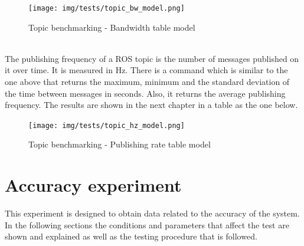 \begin{itemize}
		\begin{figure}[H]
				\begin{center}
			    \texttt{[image: img/tests/topic\_bw\_model.png]}
				\caption[Topic benchmarking - Bandwidth table model]{Topic benchmarking - Bandwidth table model}
				\end{center}
		\end{figure}
		\\

		The publishing frequency of a ROS topic is the number of messages published on it over time. 
		It is measured in Hz. 
		There is a command which is similar to the one above that returns the maximum, minimum and the standard deviation of the time between messages in seconds. 
		Also, it returns the average publishing frequency.  
		The results are shown in the next chapter in a table as the one below. 

		\begin{figure}[H]
				\begin{center}
			    \texttt{[image: img/tests/topic\_hz\_model.png]}
				\caption[Topic benchmarking - Publishing rate table model]{Topic benchmarking - Publishing rate table model}
				\end{center}
		\end{figure}
			\end{itemize}

\newpage

\section{Accuracy experiment}

	This experiment is designed to obtain data related to the accuracy of the system. 
	\\

	In the following sections the conditions and parameters that affect the test are shown and explained as well as the testing procedure that is followed. \\[0.5cm]

